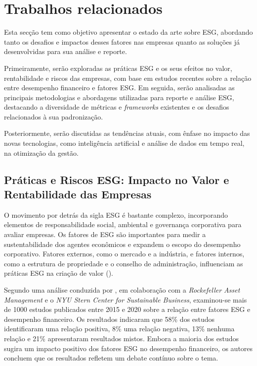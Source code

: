 \section{Trabalhos relacionados} 
\label{sec:TR} 

Esta secção tem como objetivo apresentar o estado da arte sobre ESG, abordando tanto os desafios e impactos desses fatores nas empresas quanto as soluções já desenvolvidas para sua análise e reporte.  

Primeiramente, serão exploradas as práticas ESG e os seus efeitos no valor, rentabilidade e riscos das empresas, com base em estudos recentes sobre a relação entre desempenho financeiro e fatores ESG. Em seguida, serão analisadas as principais metodologias e abordagens utilizadas para reporte e análise ESG, destacando a diversidade de métricas e \textit{frameworks} existentes e os desafios relacionados à sua padronização.  

Posteriormente, serão discutidas as tendências atuais, com ênfase no impacto das novas tecnologias, como inteligência artificial e análise de dados em tempo real, na otimização da gestão.


\subsection{Práticas e Riscos ESG: Impacto no Valor e Rentabilidade das Empresas}
\label{subsec:PESGE}

O movimento por detrás da sigla ESG é bastante complexo, incorporando elementos de responsabilidade social, ambiental e governança corporativa para avaliar empresas. Os fatores de \gls{ESG} são importantes para medir a sustentabilidade dos agentes econômicos e expandem o escopo do desempenho corporativo. Fatores externos, como o mercado e a indústria, e fatores internos, como a estrutura de propriedade e o conselho de administração, influenciam as práticas ESG na criação de valor (\cite{Wang2023}).

Segundo uma análise conduzida por \cite{Whelan2021}, em colaboração com a \textit{Rockefeller Asset Management} e o \textit{NYU Stern Center for Sustainable Business}, examinou-se mais de 1000 estudos publicados entre 2015 e 2020 sobre a relação entre fatores ESG e desempenho financeiro. Os resultados indicaram que 58\% dos estudos identificaram uma relação positiva, 8\% uma relação negativa, 13\% nenhuma relação e 21\% apresentaram resultados mistos. Embora a maioria dos estudos sugira um impacto positivo dos fatores ESG no desempenho financeiro, os autores concluem que os resultados refletem um debate contínuo sobre o tema.

